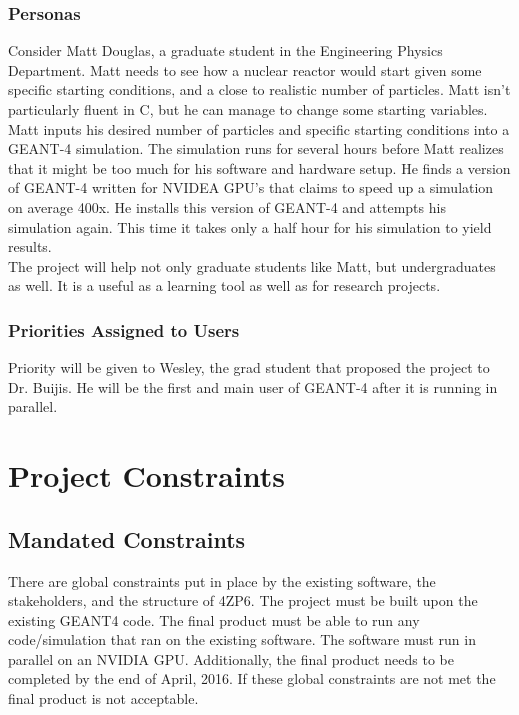\documentclass[12pt]{article}
\begin{document}
\subsubsection{Personas}
Consider Matt Douglas, a graduate student in the Engineering Physics Department. Matt needs to see how a nuclear reactor would start given some specific starting conditions, and a close to realistic number of particles. Matt isn't particularly fluent in C, but he can manage to change some starting variables. Matt inputs his desired number of particles and specific starting conditions into a GEANT-4 simulation. The simulation runs for several hours before Matt realizes that it might be too much for his software and hardware setup. He finds a version of GEANT-4 written for NVIDEA GPU's that claims to speed up a simulation 	on average 400x. He installs this version of GEANT-4 and attempts his simulation again. This time it takes only a half hour for	his simulation to yield results.\\
	
The project will help not only graduate students like Matt, but undergraduates as well. It is a useful as a learning tool as well as for research projects.

\subsubsection{Priorities Assigned to Users}
Priority will be given to Wesley, the grad student that proposed the project to Dr. Buijis. He will be the first and main user of GEANT-4 after it is running in parallel. 

\section{Project Constraints}

\subsection{Mandated Constraints} %
There are global constraints put in place by the existing software, the stakeholders, and the structure of 4ZP6. The project must be built upon the existing GEANT4 code. The final product must be able to run any code/simulation that ran on the existing software. The software must run in parallel on an NVIDIA GPU. Additionally, the final product needs to be completed by the end of April, 2016. If these global constraints are not met the final product is not acceptable.\\
\end{document}
